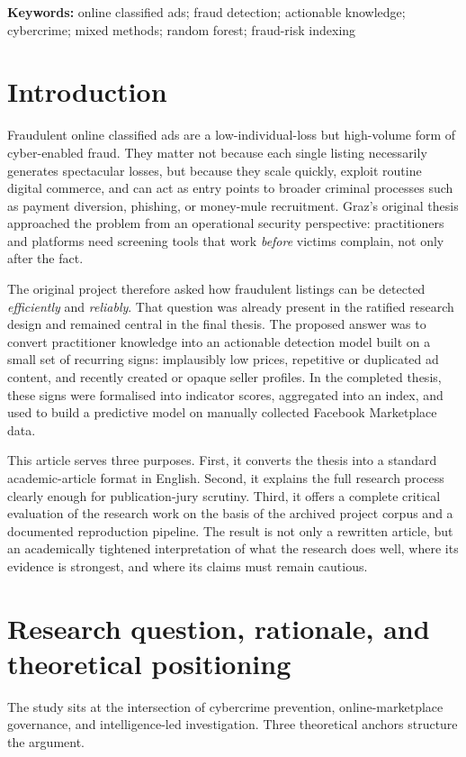 \documentclass[11pt,a4paper]{article}
\begin{document}
\textbf{Keywords:} online classified ads; fraud detection; actionable knowledge; cybercrime; mixed methods; random forest; fraud-risk indexing

\newpage

\tableofcontents

\newpage

\section{Introduction}
Fraudulent online classified ads are a low-individual-loss but high-volume form of cyber-enabled fraud. They matter not because each single listing necessarily generates spectacular losses, but because they scale quickly, exploit routine digital commerce, and can act as entry points to broader criminal processes such as payment diversion, phishing, or money-mule recruitment. Graz's original thesis approached the problem from an operational security perspective: practitioners and platforms need screening tools that work \emph{before} victims complain, not only after the fact.

The original project therefore asked how fraudulent listings can be detected \emph{efficiently} and \emph{reliably}. That question was already present in the ratified research design and remained central in the final thesis. The proposed answer was to convert practitioner knowledge into an actionable detection model built on a small set of recurring signs: implausibly low prices, repetitive or duplicated ad content, and recently created or opaque seller profiles. In the completed thesis, these signs were formalised into indicator scores, aggregated into an index, and used to build a predictive model on manually collected Facebook Marketplace data.

This article serves three purposes. First, it converts the thesis into a standard academic-article format in English. Second, it explains the full research process clearly enough for publication-jury scrutiny. Third, it offers a complete critical evaluation of the research work on the basis of the archived project corpus and a documented reproduction pipeline. The result is not only a rewritten article, but an academically tightened interpretation of what the research does well, where its evidence is strongest, and where its claims must remain cautious.

\section{Research question, rationale, and theoretical positioning}
The study sits at the intersection of cybercrime prevention, online-marketplace governance, and intelligence-led investigation. Three theoretical anchors structure the argument.
\end{document}
